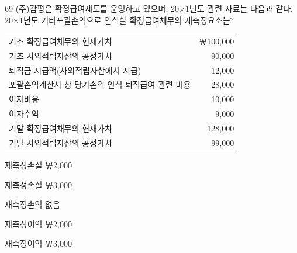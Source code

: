 \begin{question}{69}
(주)감평은 확정급여제도를 운영하고 있으며, 20×1년도 관련 자료는 다음과 같다. 20×1년도 기타포괄손익으로 인식할 확정급여채무의 재측정요소는?
\begin{framedtext}
{\small\begin{tabular}{@{}lr@{}}
기초 확정급여채무의 현재가치 & ￦100,000 \\
기초 사외적립자산의 공정가치 & 90,000 \\
퇴직금 지급액(사외적립자산에서 지급) & 12,000 \\
포괄손익계산서 상 당기손익 인식 퇴직급여 관련 비용 & 28,000 \\
이자비용 & 10,000 \\
이자수익 & 9,000 \\
기말 확정급여채무의 현재가치 & 128,000 \\
기말 사외적립자산의 공정가치 & 99,000 \\
\end{tabular}\par}
\end{framedtext}
\begin{choices}
  \item 재측정손실 ￦2,000
  \item 재측정손실 ￦3,000
  \item 재측정손익 없음
  \item 재측정이익 ￦2,000
  \item 재측정이익 ￦3,000
\end{choices}
\end{question}

